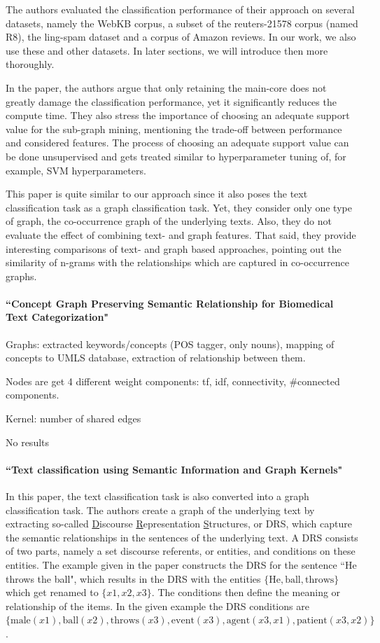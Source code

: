 The authors evaluated the classification performance of their approach on several datasets, namely the WebKB corpus, a subset of the reuters-21578 corpus (named R8), the ling-spam dataset and a corpus of Amazon reviews.
In our work, we also use these and other datasets. In later sections, we will introduce then more thoroughly.

In the paper, the authors argue that only retaining the main-core does not greatly damage the classification performance, yet it significantly reduces the compute time.
They also stress the importance of choosing an adequate support value for the sub-graph mining, mentioning the trade-off between performance and considered features. The process of choosing an adequate support value can be done unsupervised and gets treated similar to hyperparameter tuning of, for example, SVM hyperparameters.

This paper is quite similar to our approach since it also poses the text classification task as a graph classification task. Yet, they consider only one type of graph, the co-occurrence graph of the underlying texts.
Also, they do not evaluate the effect of combining text- and graph features.
That said, they provide interesting comparisons of text- and graph based approaches, pointing out the similarity of n-grams with the relationships which are captured in co-occurrence graphs.

\paragraph{``Concept Graph Preserving Semantic Relationship for Biomedical Text Categorization" \cite{Gulrandhe2015}}
Graphs: extracted keywords/concepts (POS tagger, only nouns), mapping of concepts to UMLS database, extraction of relationship between them.

Nodes are get 4 different weight components: tf, idf, connectivity, \#connected components.

Kernel: number of shared edges

No results


\paragraph{``Text classification using Semantic Information and Graph Kernels" \cite{???}}
In this paper, the text classification task is also converted into a graph classification task.
The authors create a graph of the underlying text by extracting so-called \underline{D}iscourse \underline{R}epresentation \underline{S}tructures, or DRS, which capture the semantic relationships in the sentences of the underlying text.
A DRS consists of two parts, namely a set discourse referents, or entities, and conditions on these entities.
The example given in the paper constructs the DRS for the sentence ``He throws the ball", which results in the DRS with the entities $\{\text{He}, \text{ball}, \text{throws}\}$ which get renamed to $\{x1, x2, x3\}$.
The conditions then define the meaning or relationship of the items. In the given example the DRS conditions are $\{\text{male}(x1), \text{ball}(x2), \text{throws}(x3), \text{event}(x3), \text{agent}(x3, x1), \text{patient}(x3, x2)\}$.

